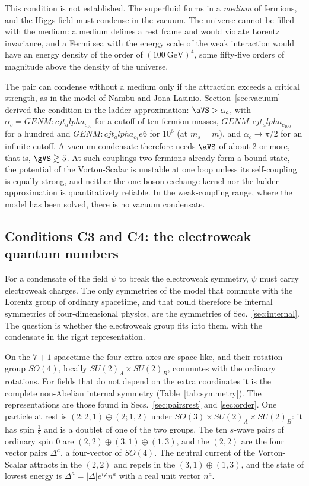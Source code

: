 This condition is not established. The superfluid forms in a \emph{medium} of fermions, and the Higgs
field must condense in the vacuum. The universe cannot be filled with the medium: a medium defines a
rest frame and would violate Lorentz invariance, and a Fermi sea with the energy scale of the weak
interaction would have an energy density of the order of $(100~\mathrm{GeV})^4$, some fifty-five
orders of magnitude above the density of the universe.

The pair can condense without a medium only if the attraction exceeds a critical strength, as in the
model of Nambu and Jona-Lasinio. Section~\ref{sec:vacuum} derived the condition in the ladder
approximation: $\aVS>\alpha_c$, with $\alpha_c={{GENM:cjt_alpha_c_10}}$ for a cutoff of ten fermion
masses, ${{GENM:cjt_alpha_c_100}}$ for a hundred and ${{GENM:cjt_alpha_c_1e6}}$ for $10^6$ (at
$m_s=m$), and $\alpha_c\to\pi/2$ for an infinite cutoff. A vacuum condensate therefore needs
$\aVS$ of about 2 or more, that is, $\gVS\gtrsim5$. At such couplings two fermions already form a
bound state, the potential of the Vorton-Scalar is unstable at one loop unless its self-coupling is
equally strong, and neither the one-boson-exchange kernel nor the ladder approximation is
quantitatively reliable. In the weak-coupling range, where the model has been solved, there is no
vacuum condensate.

\subsection{Conditions C3 and C4: the electroweak quantum numbers}

For a condensate of the field $\psi$ to break the electroweak symmetry, $\psi$ must carry electroweak
charges. The only symmetries of the model that commute with the Lorentz group of ordinary spacetime,
and that could therefore be internal symmetries of four-dimensional physics, are the symmetries of
Sec.~\ref{sec:internal}. The question is whether the electroweak group fits into them, with the
condensate in the right representation.

On the $7+1$ spacetime the four extra axes are space-like, and their rotation group $SO(4)$, locally
$SU(2)_A\times SU(2)_B$, commutes with the ordinary rotations. For fields that do not depend on the
extra coordinates it is the complete non-Abelian internal symmetry (Table~\ref{tab:symmetry}). The
representations are those found in Secs.~\ref{sec:pairsrest} and \ref{sec:order}. One particle at
rest is $(2;2,1)\oplus(2;1,2)$ under $SO(3)\times SU(2)_A\times SU(2)_B$: it has spin $\tfrac12$ and
is a doublet of one of the two groups. The ten $s$-wave pairs of ordinary spin 0 are
$(2,2)\oplus(3,1)\oplus(1,3)$, and the $(2,2)$ are the four vector pairs $\Delta^a$, a four-vector of
$SO(4)$. The neutral current of the Vorton-Scalar attracts in the $(2,2)$ and repels in the
$(3,1)\oplus(1,3)$, and the state of lowest energy is $\Delta^a=|\Delta|e^{i\varphi}n^a$ with a real
unit vector $n^a$.

